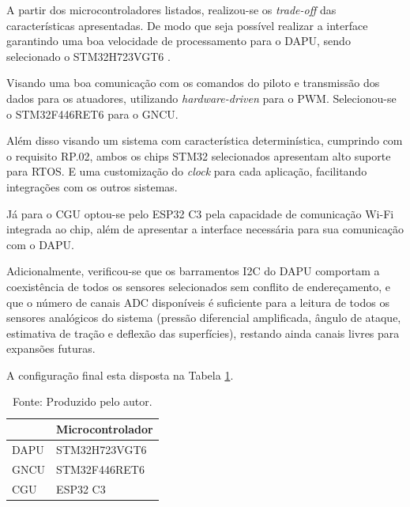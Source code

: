 A partir dos microcontroladores listados, realizou-se os \textit{trade-off} das características apresentadas. De modo que seja possível realizar a interface garantindo uma boa velocidade de processamento para o DAPU, sendo selecionado o STM32H723VGT6 \cite{st_stm32h723zg_2025}.

Visando uma boa comunicação com os comandos do piloto e transmissão dos dados para os atuadores, utilizando \textit{hardware-driven} para o PWM. Selecionou-se o STM32F446RET6 \cite{st_stm32f446mc_2016}  para o GNCU.

Além disso visando um sistema com característica determinística, cumprindo com o requisito RP.02, ambos os chips STM32 selecionados apresentam alto suporte para RTOS. E uma customização do \textit{clock} para cada aplicação, facilitando integrações com os outros sistemas.

Já para o CGU optou-se pelo ESP32 C3 \cite{espressif_esp32c3_2025}  pela capacidade de comunicação Wi-Fi integrada ao chip, além de apresentar a interface necessária para sua comunicação com o DAPU.

Adicionalmente, verificou-se que os barramentos I2C do DAPU comportam a coexistência de todos os sensores selecionados sem conflito de endereçamento, e que o número de canais ADC disponíveis é suficiente para a leitura de todos os sensores analógicos do sistema (pressão diferencial amplificada, ângulo de ataque, estimativa de tração e deflexão das superfícies), restando ainda canais livres para expansões futuras.

A configuração final esta disposta na Tabela \ref{Tab:NucleoProcessador}.

\begin{table}[H]
\centering
\caption{Microcontroladores para suas respectivos sistemas.}
\begin{tabular}{|l|l|}
\hline
\rowcolor[HTML]{C0C0C0} 
\multicolumn{1}{|c|}{\cellcolor[HTML]{C0C0C0}\textbf{Sistema}} & \multicolumn{1}{c|}{\cellcolor[HTML]{C0C0C0}\textbf{Microcontrolador}} \\ \hline
\rowcolor[HTML]{FFFFFF} 
DAPU                              & STM32H723VGT6                                                             \\ \hline
GNCU                                            & STM32F446RET6                                                             \\ \hline
CGU                                      & ESP32 C3                                                                  \\ \hline
\end{tabular}
\label{Tab:NucleoProcessador}
\caption*{Fonte: Produzido pelo autor.}
\end{table}

